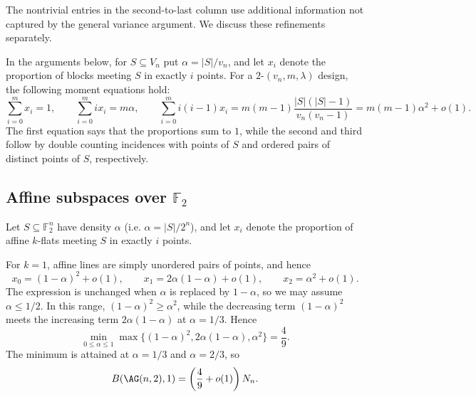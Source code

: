 \documentclass[10pt]{article}
\theoremstyle{definition}
\begin{document}
	
	The nontrivial entries in the second-to-last column use additional information not
	captured by the general variance argument. We discuss these refinements
	separately.
	
	{In the arguments below, for \(S\subseteq V_n\) put
		\(\alpha=|S|/v_n\), and let \(x_i\) denote the proportion of blocks
		meeting \(S\) in exactly \(i\) points. For a \(2\text{-}(v_n,m,\lambda)\)
		design, the following moment equations hold:
		\[
		\sum_{i=0}^m x_i=1,\qquad
		\sum_{i=0}^m i x_i=m\alpha,\qquad
		\sum_{i=0}^m i(i-1)x_i
		=m(m-1)\frac{|S|(|S|-1)}{v_n(v_n-1)}
		=m(m-1)\alpha^2+o(1).
		\]
		The first equation says that the proportions sum to \(1\), while the
		second and third follow by double counting incidences with points of
		\(S\) and ordered pairs of distinct points of \(S\), respectively.}
	
	
	\subsection{Affine subspaces over
		\texorpdfstring{\(\mathbb F_2\)}{F2}}
	
	Let \(S\subseteq\mathbb F_2^n\) have density \(\alpha\) {(i.e. \(\alpha=|S|/2^n\))}, and let \(x_i\)
	denote the proportion of affine \(k\)-flats meeting \(S\) in exactly
	\(i\) points. 
	
	For \(k=1\), affine lines are simply unordered pairs of
	points, and hence
	\[
	x_0=(1-\alpha)^2+o(1),\qquad
	x_1=2\alpha(1-\alpha)+o(1),\qquad
	x_2=\alpha^2+o(1).
	\]
	{The expression is unchanged when \(\alpha\) is replaced by
		\(1-\alpha\), so we may assume \(\alpha\leq1/2\). In this range,
		\((1-\alpha)^2\geq\alpha^2\), while the decreasing term
		\((1-\alpha)^2\) meets the increasing term \(2\alpha(1-\alpha)\) at
		\(\alpha=1/3\). Hence}
	\[
	\min_{0\leq\alpha\leq1}
	\max\{(1-\alpha)^2,2\alpha(1-\alpha),\alpha^2\}=\frac49.
	\]
	The minimum is attained at \(\alpha=1/3\) and \(\alpha=2/3\), so
	\[
	B(\AG(n,2),1)=\left(\frac49+o(1)\right)N_n.
	\]
	
\end{document}
